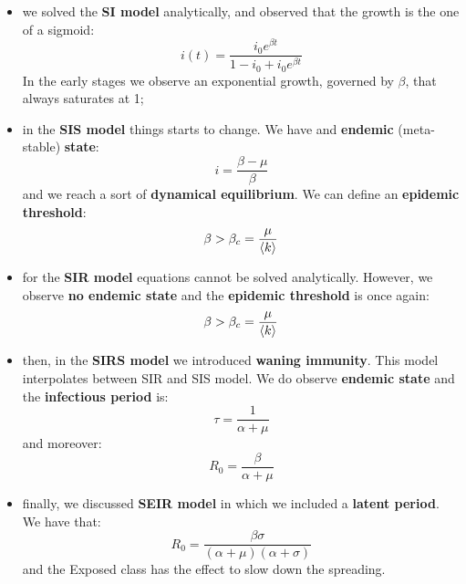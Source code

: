 \documentclass[../main/main.tex]{subfiles}
\begin{document}
\begin{itemize}
\item we solved the \textbf{SI model} analytically, and observed that the growth is the one of a sigmoid:
\begin{equation*}
  i(t) = \frac{i_0 e^{\beta t} }{1-i_0 + i_0 e^{\beta t} }
\end{equation*}
In the early stages we observe an exponential growth, governed by \( \beta  \), that always saturates at 1;

\item in the \textbf{SIS model} things starts to change. We have and \textbf{endemic} (meta-stable) \textbf{state}:
\begin{equation*}
  i= \frac{\beta -\mu }{\beta }
\end{equation*}
and we reach a sort of \textbf{dynamical equilibrium}. We can define an \textbf{epidemic threshold}:
\begin{equation*}
  \beta > \beta _c = \frac{\mu }{\expval{k} }
\end{equation*}

\item for the \textbf{SIR model} equations cannot be solved analytically. However, we observe \textbf{no endemic state} and the \textbf{epidemic threshold} is once again:
\begin{equation*}
  \beta > \beta _c = \frac{\mu }{\expval{k} }
\end{equation*}

\item then, in the \textbf{SIRS model} we introduced \textbf{waning immunity}. This model interpolates between SIR and SIS model. We do observe \textbf{endemic state} and the \textbf{infectious period} is:
\begin{equation*}
  \tau = \frac{1}{\alpha + \mu }
\end{equation*}
and moreover:
 \begin{equation*}
   R_0 = \frac{\beta }{\alpha + \mu }
 \end{equation*}

\item finally, we discussed \textbf{SEIR model} in which we included a \textbf{latent period}. We have that:
\begin{equation*}
  R_0 = \frac{\beta \sigma }{(\alpha + \mu )(\alpha +\sigma )}
\end{equation*}
and the Exposed class has the effect to slow down the spreading.
\end{itemize}
\end{document}
